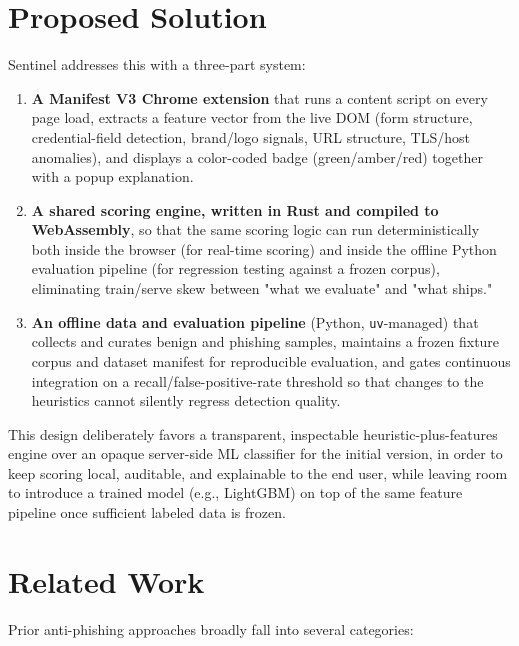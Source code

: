\documentclass[conference]{IEEEtran}
\begin{document}
\section{Proposed Solution}
Sentinel addresses this with a three-part system:

\begin{enumerate}
  \item \textbf{A Manifest V3 Chrome extension} that runs a content script on every page load, extracts a feature vector from the live DOM (form structure, credential-field detection, brand/logo signals, URL structure, TLS/host anomalies), and displays a color-coded badge (green/amber/red) together with a popup explanation.
  \item \textbf{A shared scoring engine, written in Rust and compiled to WebAssembly}, so that the same scoring logic can run deterministically both inside the browser (for real-time scoring) and inside the offline Python evaluation pipeline (for regression testing against a frozen corpus), eliminating train/serve skew between "what we evaluate" and "what ships."
  \item \textbf{An offline data and evaluation pipeline} (Python, \texttt{uv}-managed) that collects and curates benign and phishing samples, maintains a frozen fixture corpus and dataset manifest for reproducible evaluation, and gates continuous integration on a recall/false-positive-rate threshold so that changes to the heuristics cannot silently regress detection quality.
\end{enumerate}

This design deliberately favors a transparent, inspectable heuristic-plus-features engine over an opaque server-side ML classifier for the initial version, in order to keep scoring local, auditable, and explainable to the end user, while leaving room to introduce a trained model (e.g., LightGBM) on top of the same feature pipeline once sufficient labeled data is frozen.

\section{Related Work}
Prior anti-phishing approaches broadly fall into several categories:
\end{document}
